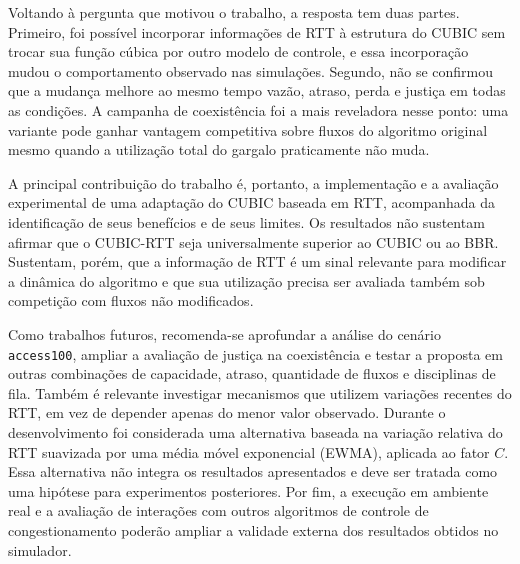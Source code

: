 Voltando à pergunta que motivou o trabalho, a resposta tem duas partes. Primeiro, foi possível incorporar informações de RTT à estrutura do CUBIC sem trocar sua função cúbica por outro modelo de controle, e essa incorporação mudou o comportamento observado nas simulações. Segundo, não se confirmou que a mudança melhore ao mesmo tempo vazão, atraso, perda e justiça em todas as condições. A campanha de coexistência foi a mais reveladora nesse ponto: uma variante pode ganhar vantagem competitiva sobre fluxos do algoritmo original mesmo quando a utilização total do gargalo praticamente não muda.

A principal contribuição do trabalho é, portanto, a implementação e a avaliação experimental de uma adaptação do CUBIC baseada em RTT, acompanhada da identificação de seus benefícios e de seus limites. Os resultados não sustentam afirmar que o CUBIC-RTT seja universalmente superior ao CUBIC ou ao BBR. Sustentam, porém, que a informação de RTT é um sinal relevante para modificar a dinâmica do algoritmo e que sua utilização precisa ser avaliada também sob competição com fluxos não modificados.

Como trabalhos futuros, recomenda-se aprofundar a análise do cenário \texttt{access100}, ampliar a avaliação de justiça na coexistência e testar a proposta em outras combinações de capacidade, atraso, quantidade de fluxos e disciplinas de fila. Também é relevante investigar mecanismos que utilizem variações recentes do RTT, em vez de depender apenas do menor valor observado. Durante o desenvolvimento foi considerada uma alternativa baseada na variação relativa do RTT suavizada por uma média móvel exponencial (EWMA), aplicada ao fator $C$. Essa alternativa não integra os resultados apresentados e deve ser tratada como uma hipótese para experimentos posteriores. Por fim, a execução em ambiente real e a avaliação de interações com outros algoritmos de controle de congestionamento poderão ampliar a validade externa dos resultados obtidos no simulador.

\appendix
